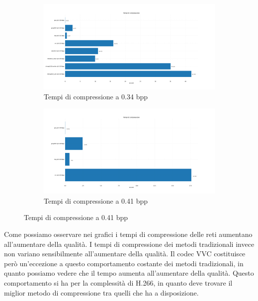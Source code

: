 \newpage
\begin{figure}[!h]
    \begin{subfigure}[]{1\textwidth}
        \centering
        \includegraphics[width=\textwidth]{Immagini/METRICS/times@0.34bpp.png}
        \caption{Tempi di compressione a 0.34 bpp}
        \label{fig:times34}
    \end{subfigure}
    \hspace*{0.5cm}
    \begin{subfigure}[]{1\textwidth}
        \centering
        \includegraphics[width=\textwidth]{Immagini/METRICS/times@0.41bpp.png}
        \caption{Tempi di compressione a 0.41 bpp}
        \label{fig:times41}
    \end{subfigure}
    \label{fig:CompressionTimes3}
\end{figure}
\clearpage
Come possiamo osservare nei grafici i tempi di compressione delle reti aumentano all’aumentare della qualità. I tempi di compressione dei metodi tradizionali invece non variano sensibilmente all’aumentare della qualità. Il codec VVC costituisce però un’eccezione a questo comportamento costante dei metodi tradizionali, in quanto possiamo vedere che il tempo aumenta all’aumentare della qualità. Questo comportamento si ha per la complessità di H.266, in quanto deve trovare il miglior metodo di compressione tra quelli che ha a disposizione.\\
